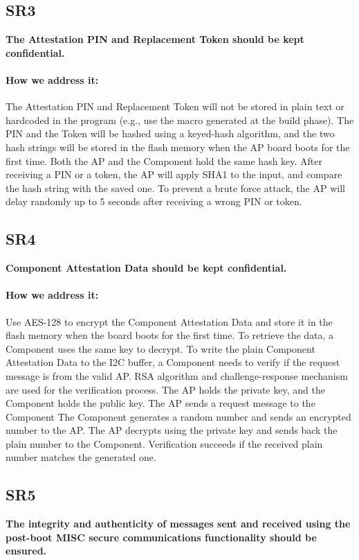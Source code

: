 \documentclass[11pt,oneside,onecolumn,letterpaper]{article}
\newcounter{alg}
\begin{document}
\subsection{SR3}
\textbf{The Attestation PIN and Replacement Token should be kept confidential.}
\paragraph{How we address it:}
The Attestation PIN and Replacement Token will not be stored in plain text or hardcoded in the program (e.g., use the macro generated at the build phase).
The PIN and the Token will be hashed using a keyed-hash algorithm,
and the two hash strings will be stored in the flash memory when the AP board boots for the first time.
Both the AP and the Component hold the same hash key.
After receiving a PIN or a token,
the AP will apply SHA1 to the input,
and compare the hash string with the saved one.
To prevent a brute force attack,
the AP will delay randomly up to 5 seconds after receiving a wrong PIN or token.

\subsection{SR4}
\textbf{Component Attestation Data should be kept confidential.}
\paragraph{How we address it:}
Use AES-128 to encrypt the Component Attestation Data and store it in the flash memory when the board boots for the first time.
To retrieve the data,
a Component uses the same key to decrypt.
To write the plain Component Attestation Data to the I2C buffer,
a Component needs to verify if the request message is from the valid AP.
RSA algorithm and challenge-response mechanism are used for the verification process.
The AP holds the private key,
and the Component holds the public key.
The AP sends a request message to the Component
The Component generates a random number and sends an encrypted number to the AP.
The AP decrypts using the private key and sends back the plain number to the Component.
Verification succeeds if the received plain number matches the generated one.

\subsection{SR5}
\textbf{The integrity and authenticity of messages sent and received using the post-boot MISC secure communications functionality should be ensured.}
\end{document}
